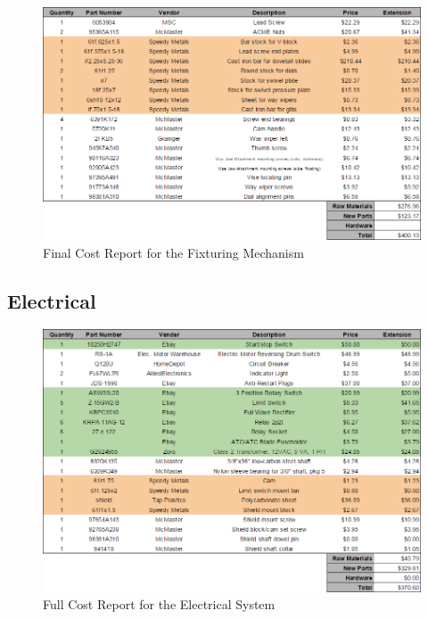 \begin{figure}[htp]
    \centering
    \includegraphics[width=1.0\textwidth]{./fall-report pictures/Chapter4-BillofMaterials/FCRF}
    \caption{Final Cost Report for the Fixturing Mechanism}
    \label{fig:FCRF}
\end{figure}


\newpage

\subsection{Electrical}

\begin{figure}[H]
    \centering
    \includegraphics[width=1.0\textwidth]{./fall-report pictures/Chapter4-BillofMaterials/CRE}
    \caption{Full Cost Report for the Electrical System}
    \label{fig:CRE}
\end{figure}

